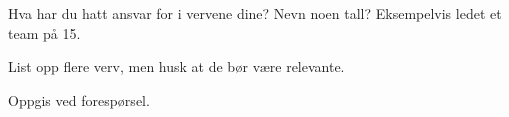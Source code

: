 


Hva har du hatt ansvar for i vervene dine? Nevn noen tall? Eksempelvis ledet et team på 15. 


\divider

List opp flere verv, men husk at de bør være relevante. 

 








Oppgis ved forespørsel.

